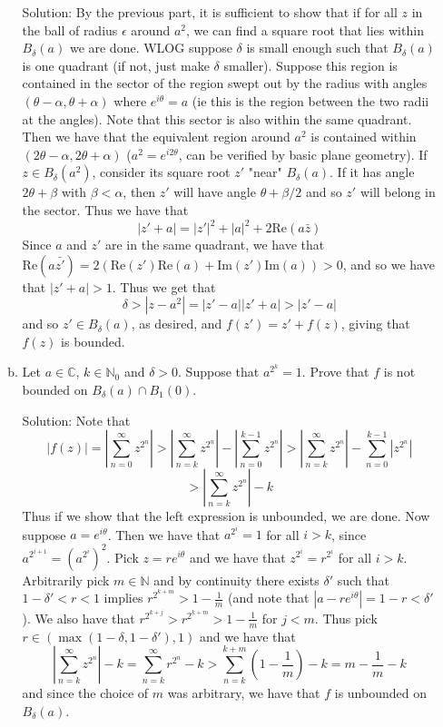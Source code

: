 \documentclass[11pt]{article}
\newcommand{\re}[0]{\text{Re}}
\newcommand{\im}[0]{\text{Im}}
\newcommand{\C}{\mathbb{C}}
\begin{document}
\begin{enumerate}[(1)]
\begin{enumerate}[(a)]
Solution: By the previous part, it is sufficient to show that if for all $z$ in the ball of radius $\epsilon$ around $a^2$, we can find a square root that lies within $B_{\delta}(a)$ we are done. WLOG suppose $\delta$ is small enough such that $B_{\delta}(a)$ is one quadrant (if not, just make $\delta$ smaller). Suppose this region is contained in the sector of the region swept out by the radius with angles $(\theta - \alpha, \theta+\alpha)$ where $e^{i\theta} = a$ (ie this is the region between the two radii at the angles). Note that this sector is also within the same quadrant. Then we have that the equivalent region around $a^2$ is contained within $(2\theta - \alpha, 2\theta + \alpha)$ ($a^2 = e^{i2\theta}$, can be verified by basic plane geometry). If $z \in B_{\delta}(a^2)$, consider its square root $z'$ "near" $B_{\delta}(a)$. If it has angle $2\theta + \beta$ with $\beta < \alpha$, then $z'$ will have angle $\theta + \beta/2$ and so $z'$ will belong in the sector. Thus we have that 
$$ |z' + a| = |z'|^2 + |a|^2 + 2\re(a\bar{z}) $$
Since $a$ and $z'$ are in the same quadrant, we have that $\re(a\bar{z'}) = 2(\re(z')\re(a) + \im(z')\im(a)) > 0$, and so we have that $|z' + a| > 1$. Thus we get that 
$$\delta >  |z - a^2| = |z' - a||z' + a| > |z' - a| $$
and so $z' \in B_{\delta}(a)$, as desired, and $f(z') = z' + f(z)$, giving that $f(z)$ is bounded.

\vspace{3mm}

\item Let $a \in \C$, $k \in \mathbb{N}_0$ and $\delta > 0$. Suppose that $a^{2^k} = 1$. Prove that $f$ is not bounded on $B_{\delta}(a) \cap B_{1}(0)$.

Solution: Note that 
$$ |f(z)| = | \sum_{n=0}^{\infty} z^{2^n}| > |\sum_{n=k}^{\infty} z^{2^n}| - |\sum_{n=0}^{k-1}z^{2^n}| > |\sum_{n=k}^{\infty} z^{2^n}| - \sum_{n=0}^{k-1}|z^{2^n}|$$
$$ > |\sum_{n=k}^{\infty} z^{2^n}| - k $$
Thus if we show that the left expression is unbounded, we are done. Now suppose $a = e^{i\theta}$. Then we have that $a^{2^i} = 1$ for all $i > k$, since $a^{2^{i+1}} = (a^{2^i})^2$. Pick $z = re^{i\theta}$ and we have that $z^{2^{i}} = r^{2^i}$ for all $i > k$. Arbitrarily pick $m \in \mathbb{N}$ and by continuity there exists $\delta'$ such that $1 - \delta' < r < 1$ implies $r^{2^{k+m}} > 1 - \frac{1}{m}$ (and note that $|a - re^{i\theta}| = 1 - r < \delta'$). We also have that $r^{2^{k+j}} > r^{2^{k+m}} > 1 - \frac{1}{m}$ for $j < m$. Thus pick $r \in (\max(1 - \delta, 1 - \delta'), 1)$ and we have that 
$$ |\sum_{n=k}^{\infty} z^{2^n}| - k  = \sum_{n = k}^{\infty} r^{2^n} - k > \sum_{n = k}^{k+m} (1 - \frac{1}{m}) - k = m - \frac{1}{m} - k $$
and since the choice of $m$ was arbitrary, we have that $f$ is unbounded on $B_{\delta}(a)$.


\end{enumerate}
\end{enumerate}
\end{document}
